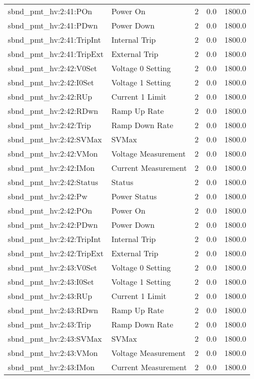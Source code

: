 \begin{center}
\begin{longtable}{l | l l l l }
sbnd\_pmt\_hv:2:41:POn & Power On & 2 & 0.0 & 1800.0\\ 
sbnd\_pmt\_hv:2:41:PDwn & Power Down & 2 & 0.0 & 1800.0\\ 
sbnd\_pmt\_hv:2:41:TripInt & Internal Trip & 2 & 0.0 & 1800.0\\ 
sbnd\_pmt\_hv:2:41:TripExt & External Trip & 2 & 0.0 & 1800.0\\ 
sbnd\_pmt\_hv:2:42:V0Set & Voltage 0 Setting & 2 & 0.0 & 1800.0\\ 
sbnd\_pmt\_hv:2:42:I0Set & Voltage 1 Setting & 2 & 0.0 & 1800.0\\ 
sbnd\_pmt\_hv:2:42:RUp & Current 1 Limit & 2 & 0.0 & 1800.0\\ 
sbnd\_pmt\_hv:2:42:RDwn & Ramp Up Rate & 2 & 0.0 & 1800.0\\ 
sbnd\_pmt\_hv:2:42:Trip & Ramp Down Rate & 2 & 0.0 & 1800.0\\ 
sbnd\_pmt\_hv:2:42:SVMax & SVMax & 2 & 0.0 & 1800.0\\ 
sbnd\_pmt\_hv:2:42:VMon & Voltage Measurement & 2 & 0.0 & 1800.0\\ 
sbnd\_pmt\_hv:2:42:IMon & Current Measurement & 2 & 0.0 & 1800.0\\ 
sbnd\_pmt\_hv:2:42:Status & Status & 2 & 0.0 & 1800.0\\ 
sbnd\_pmt\_hv:2:42:Pw & Power Status & 2 & 0.0 & 1800.0\\ 
sbnd\_pmt\_hv:2:42:POn & Power On & 2 & 0.0 & 1800.0\\ 
sbnd\_pmt\_hv:2:42:PDwn & Power Down & 2 & 0.0 & 1800.0\\ 
sbnd\_pmt\_hv:2:42:TripInt & Internal Trip & 2 & 0.0 & 1800.0\\ 
sbnd\_pmt\_hv:2:42:TripExt & External Trip & 2 & 0.0 & 1800.0\\ 
sbnd\_pmt\_hv:2:43:V0Set & Voltage 0 Setting & 2 & 0.0 & 1800.0\\ 
sbnd\_pmt\_hv:2:43:I0Set & Voltage 1 Setting & 2 & 0.0 & 1800.0\\ 
sbnd\_pmt\_hv:2:43:RUp & Current 1 Limit & 2 & 0.0 & 1800.0\\ 
sbnd\_pmt\_hv:2:43:RDwn & Ramp Up Rate & 2 & 0.0 & 1800.0\\ 
sbnd\_pmt\_hv:2:43:Trip & Ramp Down Rate & 2 & 0.0 & 1800.0\\ 
sbnd\_pmt\_hv:2:43:SVMax & SVMax & 2 & 0.0 & 1800.0\\ 
sbnd\_pmt\_hv:2:43:VMon & Voltage Measurement & 2 & 0.0 & 1800.0\\ 
sbnd\_pmt\_hv:2:43:IMon & Current Measurement & 2 & 0.0 & 1800.0\\ 

\end{longtable}
\end{center}
